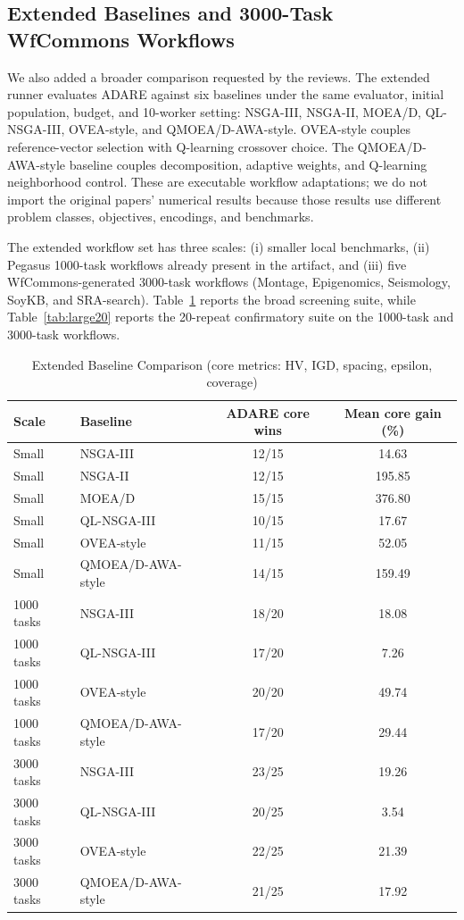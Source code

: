 \documentclass[preprint,12pt]{elsarticle}
\begin{document}
\subsection{Extended Baselines and 3000-Task WfCommons Workflows}
We also added a broader comparison requested by the reviews. The extended runner evaluates ADARE against six baselines under the same evaluator, initial population, budget, and 10-worker setting: NSGA-III, NSGA-II, MOEA/D, QL-NSGA-III, OVEA-style, and QMOEA/D-AWA-style. OVEA-style couples reference-vector selection with Q-learning crossover choice. The QMOEA/D-AWA-style baseline couples decomposition, adaptive weights, and Q-learning neighborhood control. These are executable workflow adaptations; we do not import the original papers' numerical results because those results use different problem classes, objectives, encodings, and benchmarks.

The extended workflow set has three scales: (i) smaller local benchmarks, (ii) Pegasus 1000-task workflows already present in the artifact, and (iii) five WfCommons-generated 3000-task workflows (Montage, Epigenomics, Seismology, SoyKB, and SRA-search). Table~\ref{tab:extended_baselines} reports the broad screening suite, while Table~\ref{tab:large20} reports the 20-repeat confirmatory suite on the 1000-task and 3000-task workflows.

\begin{table}[H]
\caption{Extended Baseline Comparison (core metrics: HV, IGD, spacing, epsilon, coverage)}
\label{tab:extended_baselines}
\centering
\scriptsize
\begin{tabular}{@{}l l c c@{}}
\toprule
Scale & Baseline & ADARE core wins & Mean core gain (\%) \\
\midrule
Small & NSGA-III & 12/15 & 14.63 \\
Small & NSGA-II & 12/15 & 195.85 \\
Small & MOEA/D & 15/15 & 376.80 \\
Small & QL-NSGA-III & 10/15 & 17.67 \\
Small & OVEA-style & 11/15 & 52.05 \\
Small & QMOEA/D-AWA-style & 14/15 & 159.49 \\
\midrule
1000 tasks & NSGA-III & 18/20 & 18.08 \\
1000 tasks & QL-NSGA-III & 17/20 & 7.26 \\
1000 tasks & OVEA-style & 20/20 & 49.74 \\
1000 tasks & QMOEA/D-AWA-style & 17/20 & 29.44 \\
\midrule
3000 tasks & NSGA-III & 23/25 & 19.26 \\
3000 tasks & QL-NSGA-III & 20/25 & 3.54 \\
3000 tasks & OVEA-style & 22/25 & 21.39 \\
3000 tasks & QMOEA/D-AWA-style & 21/25 & 17.92 \\
\bottomrule
\end{tabular}
\end{table}
\end{document}
